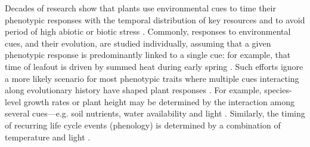 \documentclass{article}\usepackage[]{graphicx}\usepackage[]{color}
\begin{document}

Decades of research show that plants use environmental cues to time their phenotypic responses with the temporal distribution of key resources and to avoid period of high abiotic or biotic stress \citep{larcher1980,Chuine2000}. Commonly, responses to environmental cues, and their evolution, are studied individually, assuming that a given phenotypic response is predominantly linked to a single cue: for example, that time of leafout is driven by summed heat during early spring \citep{Wolkovich:2012n,davies2013phylogenetic}. Such efforts ignore a more likely scenario for most phenotypic traits where multiple cues interacting along evolutionary history have shaped plant responses \citep{}. For example, species-level growth rates or plant height may be determined by the interaction among several cues---e.g. soil nutrients, water availability and light \citep{larcher1980}. Similarly, the timing of recurring life cycle events (phenology) is determined by a combination of temperature and light \citep{chuinearees}.\\
\end{document}
